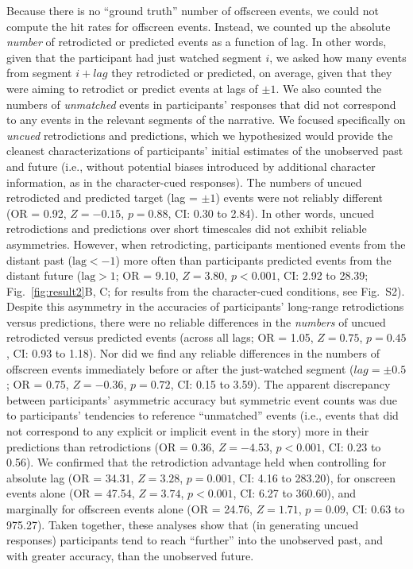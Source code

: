 \documentclass[10pt]{article}
\newcommand{\events}{S2} %
\begin{document}
Because there is no ``ground truth'' number of offscreen events, we could not compute the hit rates for offscreen events.  Instead, we counted up the absolute \textit{number} of retrodicted or predicted events as a function of lag.  In other words, given that the participant had just watched segment $i$, we asked how many events from segment $i + lag$ they retrodicted or predicted, on average, given that they were aiming to retrodict or predict events at lags of $\pm 1$.  We also counted the numbers of \textit{unmatched} events in participants' responses that did not correspond to any events in the relevant segments of the narrative.  We focused specifically on \textit{uncued} retrodictions and predictions, which we hypothesized would provide the cleanest characterizations of participants' initial estimates of the unobserved past and future (i.e., without potential biases introduced by additional character information, as in the character-cued responses).  The numbers of uncued retrodicted and predicted target (lag = $\pm 1$) events were not reliably different (OR = 0.92, $Z = -0.15$, $p = 0.88$, CI: 0.30 to 2.84).  In other words, uncued retrodictions and predictions over short timescales did not exhibit reliable asymmetries.  However, when retrodicting, participants mentioned events from the distant past ($\mathrm{lag} < -1$) more often than participants predicted events from the distant future ($\mathrm{lag} > 1$; OR = 9.10, $Z = 3.80$, $p < 0.001$, CI: 2.92 to 28.39; Fig.~\ref{fig:result2}B, C; for results from the character-cued conditions, see Fig.~\events).  Despite this asymmetry in the accuracies of participants' long-range retrodictions versus predictions, there were no reliable differences in the \textit{numbers} of uncued retrodicted versus predicted events (across all lags; OR = 1.05, $Z = 0.75$, $p = 0.45$, CI: 0.93 to 1.18).  Nor did we find any reliable differences in the numbers of offscreen events immediately before or after the just-watched segment ($lag = \pm 0.5$; OR = 0.75, $Z = -0.36$, $p = 0.72$, CI: 0.15 to 3.59).  The apparent discrepancy between participants' asymmetric accuracy but symmetric event counts was due to participants' tendencies to reference ``unmatched'' events (i.e., events that did not correspond to any explicit or implicit event in the story) more in their predictions than retrodictions (OR = 0.36, $Z = -4.53$, $p < 0.001$, CI: 0.23 to 0.56).  We confirmed that the retrodiction advantage held when controlling for absolute lag (OR = 34.31, $Z = 3.28$, $p = 0.001$, CI: 4.16 to 283.20), for onscreen events alone (OR = 47.54, $Z = 3.74$, $p < 0.001$, CI: 6.27 to 360.60), and marginally for offscreen events alone (OR = 24.76, $Z = 1.71$, $p = 0.09$, CI: 0.63 to 975.27).  Taken together, these analyses show that (in generating uncued responses) participants tend to reach ``further'' into the unobserved past, and with greater accuracy, than the unobserved future.
\end{document}
